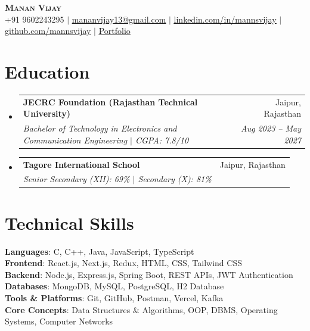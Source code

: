 \documentclass[letterpaper,11pt]{article}
\makeatletter
\newcommand{\resumeSubheading}[4]{
  \vspace{-2pt}\item
    \begin{tabular*}{0.97\textwidth}[t]{l@{\extracolsep{\fill}}r}
      \textbf{#1} & #2 \\
      \textit{\small#3} & \textit{\small #4} \\
    \end{tabular*}\vspace{-7pt}
}
\newcommand{\resumeSubHeadingListStart}{\begin{itemize}[leftmargin=0.15in, label={}]}
\newcommand{\resumeSubHeadingListEnd}{\end{itemize}}
\makeatother
\begin{document}

\begin{center}
    \textbf{\Huge \scshape Manan Vijay} \\ \vspace{3pt}
    \small
    +91 9602243295 $|$
    \href{mailto:mananvijay13@gmail.com}{\underline{mananvijay13@gmail.com}} $|$
    \href{https://www.linkedin.com/in/mannsvijay/}{\underline{linkedin.com/in/mannsvijay}} $|$
    \href{https://github.com/mannsvijay}{\underline{github.com/mannsvijay}} $|$
    \href{https://portfolio-mannsvijays-projects.vercel.app/}{\underline{Portfolio}}
\end{center}

\section{Education}
  \resumeSubHeadingListStart

    \resumeSubheading
      {JECRC Foundation (Rajasthan Technical University)}{Jaipur, Rajasthan}
      {Bachelor of Technology in Electronics and Communication Engineering $|$ CGPA: 7.8/10}{Aug 2023 -- May 2027}

    \resumeSubheading
      {Tagore International School}{Jaipur, Rajasthan}
      {Senior Secondary (XII): 69\% $|$ Secondary (X): 81\%}{}

  \resumeSubHeadingListEnd



  \section{Technical Skills}
 \begin{itemize}[leftmargin=0.15in, label={}]
    \small{\item{
     \textbf{Languages}{: C, C++, Java, JavaScript, TypeScript} \\
     \textbf{Frontend}{: React.js, Next.js, Redux, HTML, CSS, Tailwind CSS} \\
     \textbf{Backend}{: Node.js, Express.js, Spring Boot, REST APIs, JWT Authentication} \\
     \textbf{Databases}{: MongoDB, MySQL, PostgreSQL, H2 Database} \\
     \textbf{Tools \& Platforms}{: Git, GitHub, Postman, Vercel, Kafka} \\
     \textbf{Core Concepts}{: Data Structures \& Algorithms, OOP, DBMS, Operating Systems, Computer Networks} \\
    }}
 \end{itemize}
\end{document}
